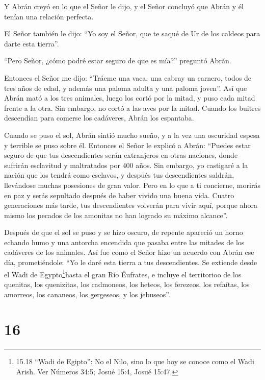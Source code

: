  Y Abrán creyó en lo que el Señor le dijo, y el Señor
concluyó que Abrán y él tenían una relación perfecta.

 El Señor también le dijo: ``Yo soy el Señor, que te saqué
de Ur de los caldeos para darte esta tierra''.

 ``Pero Señor, ¿cómo podré estar seguro de que es mía?''
preguntó Abrán.

 Entonces el Señor me dijo: ``Tráeme una vaca, una cabray un
carnero, todos de tres años de edad, y además una paloma adulta y una
paloma joven''.  Así que Abrán mató a los tres animales,
luego los cortó por la mitad, y puso cada mitad frente a la otra. Sin
embargo, no cortó a las aves por la mitad.  Cuando los
buitres descendían para comerse los cadáveres, Abrán los espantaba.

 Cuando se puso el sol, Abrán sintió mucho sueño, y a la
vez una oscuridad espesa y terrible se puso sobre él. 
Entonces el Señor le explicó a Abrán: ``Puedes estar seguro de que tus
descendientes serán extranjeros en otras naciones, donde sufrirán
esclavitud y maltratados por 400 años.  Sin embargo, yo
castigaré a la nación que los tendrá como esclavos, y después tus
descendientes saldrán, llevándose muchas posesiones de gran valor.
 Pero en lo que a ti concierne, morirás en paz y serás
sepultado después de haber vivido una buena vida.  Cuatro
generaciones más tarde, tus descendientes volverán para vivir aquí,
porque ahora mismo los pecados de los amonitas no han logrado su máximo
alcance''.

 Después de que el sol se puso y se hizo oscuro, de repente
apareció un horno echando humo y una antorcha encendida que pasaba entre
las mitades de los cadáveres de los animales.  Así fue como
el Señor hizo un acuerdo con Abrán ese día, prometiéndole: ``Yo le daré
esta tierra a tus descendientes. Se extiende desde el Wadi de
Egypto\footnote{15.18 ``Wadi de Egipto'': No el Nilo, sino lo que hoy se
  conoce como el Wadi Arish. Ver Números 34:5; Josué 15:4, Josué 15:47.}hasta
el gran Río Éufrates,  e incluye el territorioo de los
quenitas, los quenizitas, los cadmoneos,  los heteos, los
ferezeos, los refaítas,  los amorreos, los cananeos, los
gergeseos, y los jebuseos''.

\hypertarget{section-15}{%
\section{16}\label{section-15}}

